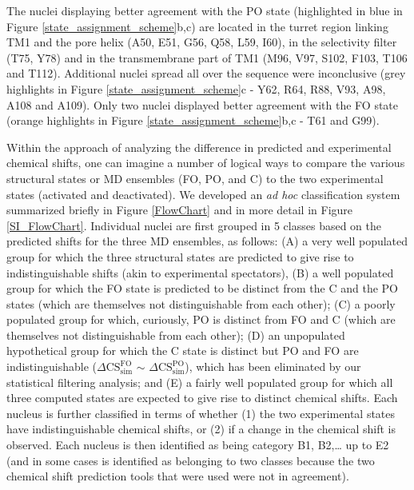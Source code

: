 \documentclass[%
 aip,
 amsmath,amssymb,
 preprint,%
]{revtex4-1}
\begin{document}
The nuclei displaying better agreement with the PO state (highlighted in blue in Figure \ref{state_assignment_scheme}b,c) are located in the turret region linking TM1 and the pore helix (A50, E51, G56, Q58, L59, I60), in the selectivity filter (T75, Y78) and in the transmembrane part of TM1 (M96, V97, S102, F103, T106 and T112). Additional nuclei spread all over the sequence were inconclusive (grey highlights in Figure \ref{state_assignment_scheme}c - Y62, R64, R88, V93, A98, A108 and A109). Only two nuclei displayed better agreement with the FO state (orange highlights in Figure \ref{state_assignment_scheme}b,c - T61 and G99).

Within the approach of analyzing the difference in predicted and experimental chemical shifts, one can imagine a number of logical ways to compare the various structural states or MD ensembles (FO, PO, and C) to the two experimental states (activated and deactivated). We developed an \textit{ad hoc} classification system summarized briefly in Figure \ref{FlowChart} and in more detail in Figure \ref{SI_FlowChart}. Individual nuclei are first grouped in 5 classes based on the predicted shifts for the three MD ensembles, as follows: (A) a very well populated group for which the three structural states are predicted to give rise to indistinguishable shifts (akin to experimental spectators), (B) a well populated group for which the FO state is predicted to be distinct from the C and the PO states (which are themselves not distinguishable from each other); (C) a poorly populated group for which, curiously, PO is distinct from FO and C (which are themselves not distinguishable from each other); (D) an unpopulated hypothetical group for which the C state is distinct but PO and FO are indistinguishable ($\Delta\text{CS}_{\text{sim}}^{\text{FO}}$ $\sim$ $\Delta\text{CS}_{\text{sim}}^{\text{PO}}$), which has been eliminated by our statistical filtering analysis; and (E) a fairly well populated group for which all three computed states are expected to give rise to distinct chemical shifts. Each nucleus is further classified in terms of whether (1) the two experimental states have indistinguishable chemical shifts, or (2) if a change in the chemical shift is observed. Each nucleus is then identified as being category B1, B2,… up to E2 (and in some cases is identified as belonging to two classes because the two chemical shift prediction tools that were used were not in agreement).
\end{document}
